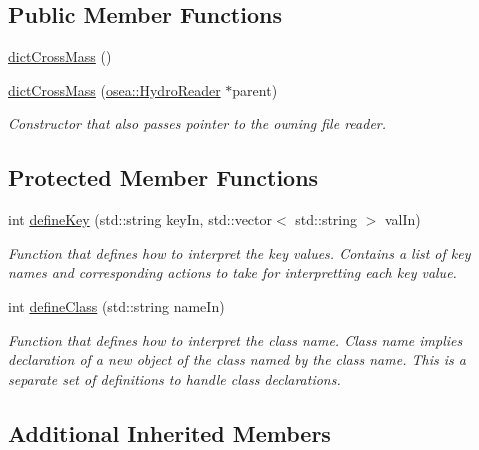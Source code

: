 \subsection*{Public Member Functions}
\begin{DoxyCompactItemize}
\item 
\hyperlink{classosea_1_1dict_cross_mass_ac123895457f878888a8124dc08e73ccf}{dict\-Cross\-Mass} ()
\item 
\hyperlink{classosea_1_1dict_cross_mass_ad70edd3e516e29761403eb5fbe1e143d}{dict\-Cross\-Mass} (\hyperlink{classosea_1_1_hydro_reader}{osea\-::\-Hydro\-Reader} $\ast$parent)
\begin{DoxyCompactList}\small\item\em Constructor that also passes pointer to the owning file reader. \end{DoxyCompactList}\end{DoxyCompactItemize}
\subsection*{Protected Member Functions}
\begin{DoxyCompactItemize}
\item 
int \hyperlink{classosea_1_1dict_cross_mass_afd69c5e51d96d6cb649e06fb247ae833}{define\-Key} (std\-::string key\-In, std\-::vector$<$ std\-::string $>$ val\-In)
\begin{DoxyCompactList}\small\item\em Function that defines how to interpret the key values. Contains a list of key names and corresponding actions to take for interpretting each key value. \end{DoxyCompactList}\item 
int \hyperlink{classosea_1_1dict_cross_mass_a0de7b6960c51d5ea40fdbafdf6237a7a}{define\-Class} (std\-::string name\-In)
\begin{DoxyCompactList}\small\item\em Function that defines how to interpret the class name. Class name implies declaration of a new object of the class named by the class name. This is a separate set of definitions to handle class declarations. \end{DoxyCompactList}\end{DoxyCompactItemize}
\subsection*{Additional Inherited Members}


